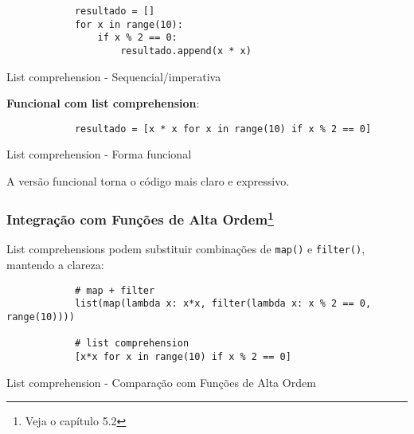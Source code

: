 \documentclass[date,twocolumn,a4paper]{ppgem}
\begin{document}
    \begin{listing}[!ht]
        \begin{verbatim}
            resultado = []
            for x in range(10):
                if x % 2 == 0:
                    resultado.append(x * x)
        \end{verbatim}
        \caption{List comprehension - Sequencial/imperativa}
        \label{listing:2}
    \end{listing}
    \textbf{Funcional com list comprehension}:
    \begin{listing}[!ht]
        \begin{verbatim}
            resultado = [x * x for x in range(10) if x % 2 == 0]
        \end{verbatim}
        \caption{List comprehension - Forma funcional}
        \label{listing:2}
    \end{listing}

    A versão funcional torna o código mais claro e expressivo.
    \subsubsection{Integração com Funções de Alta Ordem\footnote{Veja o capítulo 5.2}}
    List comprehensions podem substituir combinações de \texttt{map()} e \texttt{filter()}, mantendo a clareza:

    \begin{listing}[!ht]
        \begin{verbatim}
            # map + filter
            list(map(lambda x: x*x, filter(lambda x: x % 2 == 0, range(10))))

            # list comprehension
            [x*x for x in range(10) if x % 2 == 0]
        \end{verbatim}
        \caption{List comprehension - Comparação com Funções de Alta Ordem}
        \label{listing:2}
    \end{listing}
\end{document}
